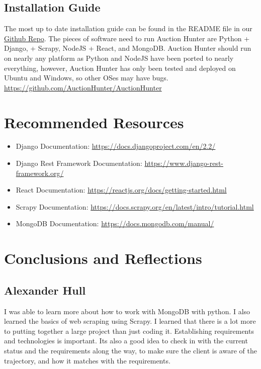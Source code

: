 \documentclass[onecolumn, draftclsnofoot, 10pt, compsoc]{IEEEtran}
\begin{document}
\subsection{Installation Guide}
The most up to date installation guide can be found in the README file in our  \href{https://github.com/AuctionHunter/AuctionHunter}{Github Repo}. The pieces of software need to run Auction Hunter are Python + Django, + Scrapy, NodeJS + React, and MongoDB. Auction Hunter should run on nearly any platform as Python and NodeJS have been ported to nearly everything, however, Auction Hunter has only been tested and deployed on Ubuntu and Windows, so other OSes may have bugs.
\url{https://github.com/AuctionHunter/AuctionHunter}

\section{Recommended Resources}
\begin{itemize}
    \item Django Documentation: \url{https://docs.djangoproject.com/en/2.2/}
    \item Django Rest Framework Documentation: \url{https://www.django-rest-framework.org/}
    \item React Documentation: \url{https://reactjs.org/docs/getting-started.html}
    \item Scrapy Documentation: \url{https://docs.scrapy.org/en/latest/intro/tutorial.html}
    \item MongoDB Documentation: \url{https://docs.mongodb.com/manual/}
\end{itemize}

\section{Conclusions and Reflections}
\subsection{Alexander Hull}
I was able to learn more about how to work with MongoDB with python. I also learned the basics of web scraping using Scrapy. I learned that there is a lot more to putting together a large project than just coding it. Establishing requirements and technologies is important. Its also a good idea to check in with the current status and the requirements along the way, to make sure the client is aware of the trajectory, and how it matches with the requirements. 
\end{document}

